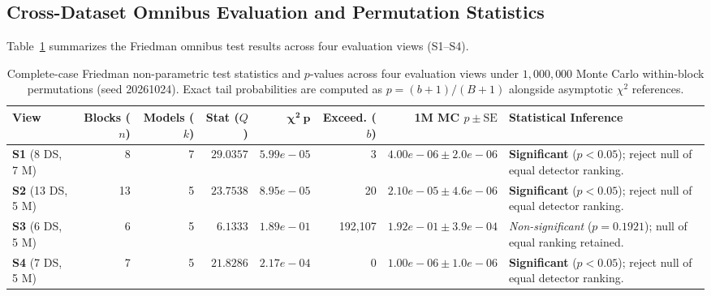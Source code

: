 \documentclass[11pt,a4paper]{article}
\begin{document}
\subsection{Cross-Dataset Omnibus Evaluation and Permutation Statistics}
Table~\ref{tab:friedman_stats} summarizes the Friedman omnibus test results across four evaluation views (S1--S4).

\begin{table}[htbp]
\centering\footnotesize\setlength{\tabcolsep}{3.0pt}
\caption{Complete-case Friedman non-parametric test statistics and $p$-values across four evaluation views under $1{,}000{,}000$ Monte Carlo within-block permutations (seed 20261024). Exact tail probabilities are computed as $p = (b+1)/(B+1)$ alongside asymptotic $\chi^2$ references.}
\label{tab:friedman_stats}
\begin{tabularx}{\textwidth}{lrrrrrr>{\raggedright\arraybackslash}X}\toprule
\textbf{View} & \textbf{Blocks ($n$)} & \textbf{Models ($k$)} & \textbf{Stat ($Q$)} & $\mathbf{\chi^2\ p}$ & \textbf{Exceed. ($b$)} & \textbf{1M MC $p \pm \text{SE}$} & \textbf{Statistical Inference} \\\midrule
\textbf{S1} (8 DS, 7 M) & 8 & 7 & $29.0357$ & $5.99e-05$ & 3 & $4.00e-06 \pm 2.0e-06$ & \textbf{Significant} ($p < 0.05$); reject null of equal detector ranking. \\
\textbf{S2} (13 DS, 5 M) & 13 & 5 & $23.7538$ & $8.95e-05$ & 20 & $2.10e-05 \pm 4.6e-06$ & \textbf{Significant} ($p < 0.05$); reject null of equal detector ranking. \\
\textbf{S3} (6 DS, 5 M) & 6 & 5 & $6.1333$ & $1.89e-01$ & 192,107 & $1.92e-01 \pm 3.9e-04$ & \textit{Non-significant} ($p = 0.1921$); null of equal ranking retained. \\
\textbf{S4} (7 DS, 5 M) & 7 & 5 & $21.8286$ & $2.17e-04$ & 0 & $1.00e-06 \pm 1.0e-06$ & \textbf{Significant} ($p < 0.05$); reject null of equal detector ranking. \\
\bottomrule
\end{tabularx}
\end{table}
\end{document}
